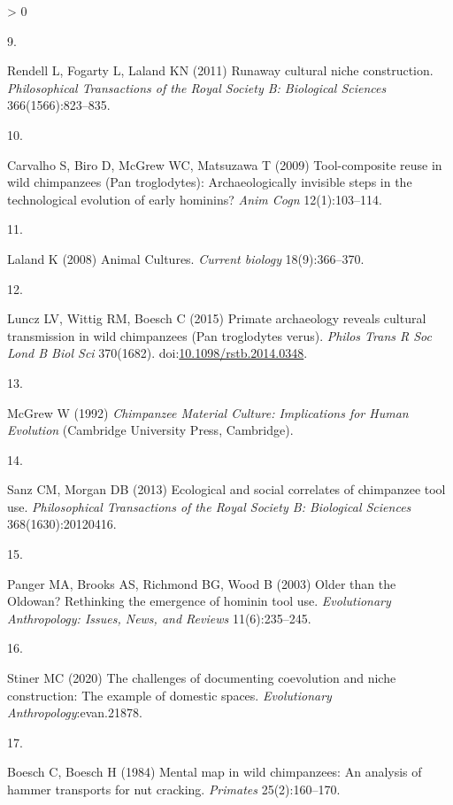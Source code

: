 \documentclass[9pt,twocolumn,twoside,]{pnas-new}
\newlength{\csllabelwidth}
\newlength{\cslhangindent}
\newenvironment{CSLReferences}[3] %
 {%
  \setlength{\parindent}{0pt}
  \ifodd #1 \everypar{\setlength{\hangindent}{\cslhangindent}}\ignorespaces\fi
  \ifnum #2 > 0
  \setlength{\parskip}{#2\baselineskip}
  \fi
 }%
 {}
\newcommand{\CSLLeftMargin}[1]{\parbox[t]{\csllabelwidth}{#1}}
\newcommand{\CSLRightInline}[1]{\parbox[t]{\linewidth - \csllabelwidth}{#1}}
\begin{document}
\begin{CSLReferences}{0}{0}
\leavevmode\hypertarget{ref-rendellRunawayCulturalNiche2011}{}%
\CSLLeftMargin{9. }
\CSLRightInline{Rendell L, Fogarty L, Laland KN (2011) Runaway cultural
niche construction. \emph{Philosophical Transactions of the Royal
Society B: Biological Sciences} 366(1566):823--835.}

\leavevmode\hypertarget{ref-carvalhoToolcompositeReuseWild2009}{}%
\CSLLeftMargin{10. }
\CSLRightInline{Carvalho S, Biro D, McGrew WC, Matsuzawa T (2009)
Tool-composite reuse in wild chimpanzees ({Pan} troglodytes):
Archaeologically invisible steps in the technological evolution of early
hominins? \emph{Anim Cogn} 12(1):103--114.}

\leavevmode\hypertarget{ref-lalandAnimalCultures2008}{}%
\CSLLeftMargin{11. }
\CSLRightInline{Laland K (2008) Animal {Cultures}. \emph{Current
biology} 18(9):366--370.}

\leavevmode\hypertarget{ref-lunczPrimateArchaeologyReveals2015}{}%
\CSLLeftMargin{12. }
\CSLRightInline{Luncz LV, Wittig RM, Boesch C (2015) Primate archaeology
reveals cultural transmission in wild chimpanzees ({Pan} troglodytes
verus). \emph{Philos Trans R Soc Lond B Biol Sci} 370(1682).
doi:\href{https://doi.org/10.1098/rstb.2014.0348}{10.1098/rstb.2014.0348}.}

\leavevmode\hypertarget{ref-mcgrewChimpanzeeMaterialCulture1992}{}%
\CSLLeftMargin{13. }
\CSLRightInline{McGrew W (1992) \emph{Chimpanzee {Material Culture}:
{Implications} for {Human Evolution}} ({Cambridge University Press},
{Cambridge}).}

\leavevmode\hypertarget{ref-sanzEcologicalSocialCorrelates2013}{}%
\CSLLeftMargin{14. }
\CSLRightInline{Sanz CM, Morgan DB (2013) Ecological and social
correlates of chimpanzee tool use. \emph{Philosophical Transactions of
the Royal Society B: Biological Sciences} 368(1630):20120416.}

\leavevmode\hypertarget{ref-pangerOlderOldowanRethinking2003}{}%
\CSLLeftMargin{15. }
\CSLRightInline{Panger MA, Brooks AS, Richmond BG, Wood B (2003) Older
than the {Oldowan}? {Rethinking} the emergence of hominin tool use.
\emph{Evolutionary Anthropology: Issues, News, and Reviews}
11(6):235--245.}

\leavevmode\hypertarget{ref-stinerChallengesDocumentingCoevolution2020}{}%
\CSLLeftMargin{16. }
\CSLRightInline{Stiner MC (2020) The challenges of documenting
coevolution and niche construction: {The} example of domestic spaces.
\emph{Evolutionary Anthropology}:evan.21878.}

\leavevmode\hypertarget{ref-boeschMentalMapWild1984}{}%
\CSLLeftMargin{17. }
\CSLRightInline{Boesch C, Boesch H (1984) Mental map in wild
chimpanzees: {An} analysis of hammer transports for nut cracking.
\emph{Primates} 25(2):160--170.}


\end{CSLReferences}
\end{document}
